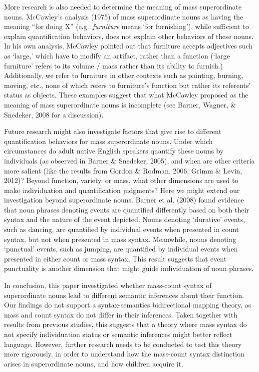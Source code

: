 \documentclass[
  man,floatsintext]{apa6}
\begin{document}
More research is also needed to determine the meaning of mass superordinate nouns. McCawley's analysis (1975) of mass superordinate nouns as having the meaning ``for doing X'' (e.g.~\emph{furniture} means `for furnishing'), while sufficient to explain quantification behaviors, does not explain other behaviors of these nouns. In his own analysis, McCawley pointed out that furniture accepts adjectives such as `large,' which have to modify an artifact, rather than a function (`large furniture' refers to its volume / mass rather than its ability to furnish.) Additionally, we refer to furniture in other contexts such as painting, burning, moving, etc., none of which refers to furniture's function but rather its referents' status as objects. These examples suggest that what McCawley proposed as the meaning of mass superordinate nouns is incomplete (see Barner, Wagner, \& Snedeker, 2008 for a discussion).

Future research might also investigate factors that give rise to different quantification behaviors for mass superordinate nouns. Under which circumstances do adult native English speakers quantify these nouns by individuals (as observed in Barner \& Snedeker, 2005), and when are other criteria more salient (like the results from Gordon \& Rodman, 2006; Grimm \& Levin, 2012)? Beyond function, variety, or mass, what other dimensions are used to make individuation and quantification judgments? Here we might extend our investigation beyond superordinate nouns. Barner et al. (2008) found evidence that noun phrases denoting events are quantified differently based on both their syntax and the nature of the event depicted. Nouns denoting `durative' events, such as dancing, are quantified by individual events when presented in count syntax, but not when presented in mass syntax. Meanwhile, nouns denoting `punctual' events, such as jumping, are quantified by individual events when presented in either count or mass syntax. This result suggests that event punctuality is another dimension that might guide individuation of noun phrases.

In conclusion, this paper investigated whether mass-count syntax of superordinate nouns lead to different semantic inferences about their function. Our findings do not support a syntax-semantics bidirectional mapping theory, as mass and count syntax do not differ in their inferences. Taken together with results from previous studies, this suggests that a theory where mass syntax do not specify individuation status or semantic inferences might better reflect language. However, further research needs to be conducted to test this theory more rigorously, in order to understand how the mass-count syntax distinction arises in superordinate nouns, and how children acquire it.
\end{document}
